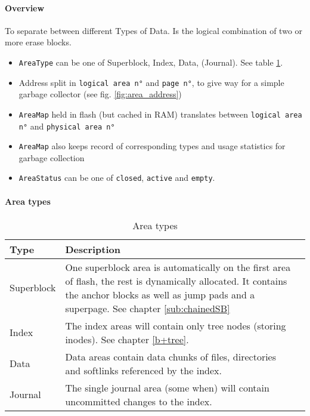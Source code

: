 \paragraph{Overview}
To separate between different Types of Data. Is the logical combination of two or more erase blocks.
\begin{itemize}
	\item \texttt{AreaType} can be one of Superblock, Index, Data, (Journal). See table \ref{tab:areatypes}.
	\item Address split in \texttt{logical area n°} and \texttt{page n°}, to give way for a simple garbage collector (see  fig. \ref{fig:area_address})
	\item \texttt{AreaMap} held in flash (but cached in RAM) translates between \texttt{logical area n°} and \texttt{physical area n°}
	\item \texttt{AreaMap} also keeps record of corresponding types and usage statistics for garbage collection
	\item\texttt{AreaStatus} can be one of \texttt{closed}, \texttt{active} and \texttt{empty}. 
\end{itemize}

\paragraph{Area types}
\begin{table}[htbp]
\caption{Area types}
\label{tab:areatypes}
\begin{tabularx}{\textwidth}{lp{11cm}p{2.5cm}}
\toprule
Type & Description\\
\midrule
Superblock & One superblock area is automatically on the first area of flash, the rest is dynamically allocated. It contains the anchor blocks as well as jump pads and a superpage. See chapter \ref{sub:chainedSB} \\
Index & The index areas will contain only tree nodes (storing inodes). See chapter \ref{b+tree}.\\
Data & Data areas contain data chunks of files, directories and softlinks referenced by the index.\\
Journal & The single journal area (some when) will contain uncommitted changes to the index.\\
\bottomrule
\end{tabularx}
\end{table} 

